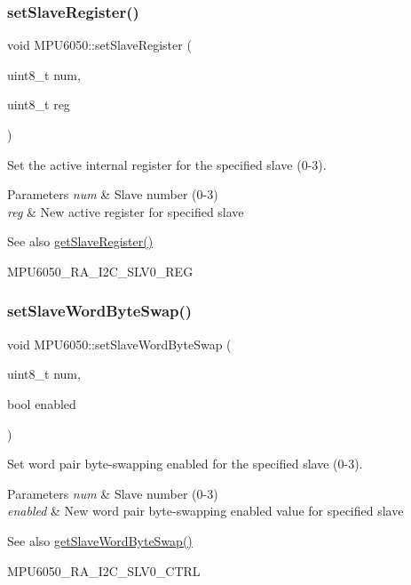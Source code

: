 \subsubsection{\texorpdfstring{setSlaveRegister()}{setSlaveRegister()}}
{\footnotesize\ttfamily void M\+P\+U6050\+::set\+Slave\+Register (\begin{DoxyParamCaption}\item[{uint8\+\_\+t}]{num,  }\item[{uint8\+\_\+t}]{reg }\end{DoxyParamCaption})}

Set the active internal register for the specified slave (0-\/3). 
\begin{DoxyParams}{Parameters}
{\em num} & Slave number (0-\/3) \\
\hline
{\em reg} & New active register for specified slave \\
\hline
\end{DoxyParams}
\begin{DoxySeeAlso}{See also}
\mbox{\hyperlink{class_m_p_u6050_ae7e9ead9645bcef326eb579c6ab5d5ff}{get\+Slave\+Register()}} 

M\+P\+U6050\+\_\+\+R\+A\+\_\+\+I2\+C\+\_\+\+S\+L\+V0\+\_\+\+R\+EG 
\end{DoxySeeAlso}
\mbox{\label{class_m_p_u6050_abeb1f83652066d7543fd3283af794364}} 
\subsubsection{\texorpdfstring{setSlaveWordByteSwap()}{setSlaveWordByteSwap()}}
{\footnotesize\ttfamily void M\+P\+U6050\+::set\+Slave\+Word\+Byte\+Swap (\begin{DoxyParamCaption}\item[{uint8\+\_\+t}]{num,  }\item[{bool}]{enabled }\end{DoxyParamCaption})}

Set word pair byte-\/swapping enabled for the specified slave (0-\/3). 
\begin{DoxyParams}{Parameters}
{\em num} & Slave number (0-\/3) \\
\hline
{\em enabled} & New word pair byte-\/swapping enabled value for specified slave \\
\hline
\end{DoxyParams}
\begin{DoxySeeAlso}{See also}
\mbox{\hyperlink{class_m_p_u6050_a18e8f3d053a68f0e5ecf497c87ecac8a}{get\+Slave\+Word\+Byte\+Swap()}} 

M\+P\+U6050\+\_\+\+R\+A\+\_\+\+I2\+C\+\_\+\+S\+L\+V0\+\_\+\+C\+T\+RL 
\end{DoxySeeAlso}
\mbox{\label{class_m_p_u6050_a32602ab86f70b70d3313628fc6c010ae}} 
